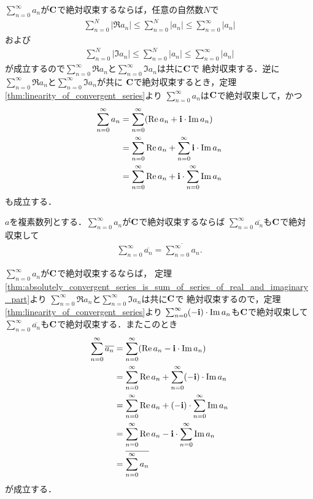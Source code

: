 	\begin{sketch}
		$\sum_{n=0}^\infty a_n$が$\mathbf{C}$で絶対収束するならば，任意の自然数$N$で
		\begin{align}
			\sum_{n=0}^N |\Re{a_n}|
			\leq \sum_{n=0}^N |a_n|
			\leq \sum_{n=0}^\infty |a_n|
		\end{align}
		および
		\begin{align}
			\sum_{n=0}^N |\Im{a_n}|
			\leq \sum_{n=0}^N |a_n|
			\leq \sum_{n=0}^\infty |a_n|
		\end{align}
		が成立するので$\sum_{n=0}^\infty \Re{a_n}$と$\sum_{n=0}^\infty \Im{a_n}$は共に$\mathbf{C}$で
		絶対収束する．逆に$\sum_{n=0}^\infty \Re{a_n}$と$\sum_{n=0}^\infty \Im{a_n}$が共に
		$\mathbf{C}$で絶対収束するとき，定理\ref{thm:linearity_of_convergent_series}より
		$\sum_{n=0}^\infty a_n$は$\mathbf{C}$で絶対収束して，かつ
		\begin{align}
			\sum_{n=0}^\infty a_n
			&= \sum_{n=0}^\infty (\operatorname{Re} a_n + \mathbf{i} \cdot \operatorname{Im} a_n) \\
			&= \sum_{n=0}^\infty \operatorname{Re} a_n + \sum_{n=0}^\infty \mathbf{i} \cdot \operatorname{Im} a_n\\
			&= \sum_{n=0}^\infty \operatorname{Re} a_n + \mathbf{i} \cdot \sum_{n=0}^\infty \operatorname{Im} a_n
		\end{align}
		も成立する．
		\QED
	\end{sketch}
	
	\begin{screen}
		\begin{thm}[絶体絶命する級数の共役は共役の級数に一致する]
		\label{thm:conjugate_of_absolutely_convergent_series_is_series_of_conjugate}
			$a$を複素数列とする．$\sum_{n=0}^\infty a_n$が$\mathbf{C}$で絶対収束するならば
			$\sum_{n=0}^\infty \overline{a_n}$も$\mathbf{C}$で絶対収束して
			\begin{align}
				\sum_{n=0}^\infty \overline{a_n} = \overline{\sum_{n=0}^\infty a_n}.
			\end{align}
		\end{thm}
	\end{screen}
	
	\begin{sketch}
		$\sum_{n=0}^\infty a_n$が$\mathbf{C}$で絶対収束するならば，
		定理\ref{thm:absolutely_convergent_series_is_sum_of_series_of_real_and_imaginary_part}より
		$\sum_{n=0}^\infty \Re{a_n}$と$\sum_{n=0}^\infty \Im{a_n}$は共に$\mathbf{C}$で
		絶対収束するので，定理\ref{thm:linearity_of_convergent_series}より
		$\sum_{n=0}^\infty (- \mathbf{i}) \cdot \operatorname{Im} a_n$も$\mathbf{C}$で絶対収束して
		$\sum_{n=0}^\infty \overline{a_n}$も$\mathbf{C}$で絶対収束する．またこのとき
		\begin{align}
			\sum_{n=0}^\infty \overline{a_n}
			&= \sum_{n=0}^\infty (\operatorname{Re} a_n - \mathbf{i} \cdot \operatorname{Im} a_n) \\
			&= \sum_{n=0}^\infty \operatorname{Re} a_n + \sum_{n=0}^\infty (-\mathbf{i}) \cdot \operatorname{Im} a_n \\
			&= \sum_{n=0}^\infty \operatorname{Re} a_n + (-\mathbf{i}) \cdot \sum_{n=0}^\infty \operatorname{Im} a_n \\
			&= \sum_{n=0}^\infty \operatorname{Re} a_n - \mathbf{i} \cdot \sum_{n=0}^\infty \operatorname{Im} a_n \\
			&= \overline{\sum_{n=0}^\infty a_n}
		\end{align}
		が成立する．
		\QED
	\end{sketch}
	
